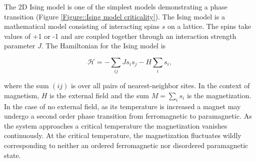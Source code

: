 \documentclass[12pt]{article}
\begin{document}
The 2D Ising model is one of the simplest models demonstrating a phase transition (Figure \ref{Figure::Ising model criticality}). The Ising model is a mathematical model consisting of interacting spins $s$ on a lattice. The spins take values of +1 or -1 and are coupled together through an interaction strength parameter $J$. The Hamiltonian for the Ising model is

\begin{equation}
\mathcal{H} = - \sum_{ij}Js_{i}s_{j} - H\sum_{i}s_{i},
\end{equation}

\noindent where the sum $(ij)$ is over all pairs of nearest-neighbor sites. In the context of magnetism, $H$ is the external field and the sum $M=\sum\limits_{i} s_{i}$ is the magnetization. In the case of no external field, as its temperature is increased a magnet may undergo a second order phase transition from ferromagnetic to paramagnetic. As the system approaches a critical temperature the magnetization vanishes continuously. At the critical temperature, the magnetization fluctuates wildly corresponding to neither an ordered ferromagnetic nor disordered paramagnetic state.
\end{document}
